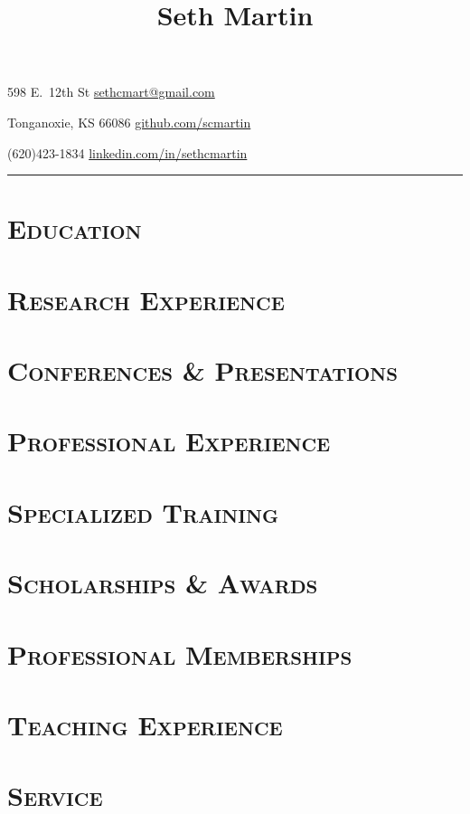 \documentclass[10pt]{article}
\title{\Huge \bf Seth Martin}
\date{}
\author{}
\begin{document}
\maketitle

\setlength{\parindent}{0ex}
598 E.~12th St \hfill \href{mailto:sethcmart@gmail.com}{sethcmart@gmail.com}

Tonganoxie, KS 66086 \hfill \href{https://github.com/scmartin}{github.com/scmartin}

(620)423-1834 \hfill \href{https://www.linkedin.com/in/sethcmartin}{linkedin.com/in/sethcmartin}
\hrule

\allsectionsfont{\sectionrule{0ex}{0pt}{-1ex}{1pt}}

\section*{\textsc{Education}}


\section*{\textsc{Research Experience}}


\nocite{*}



\section*{\textsc{Conferences \& Presentations}}


\pagebreak
\section*{\textsc{Professional Experience}}


\section*{\textsc{Specialized Training}}


\pagebreak
\section*{\textsc{Scholarships \& Awards}}


\section*{\textsc{Professional Memberships}}


\section*{\textsc{Teaching Experience}}


\section*{\textsc{Service}}

\end{document}
